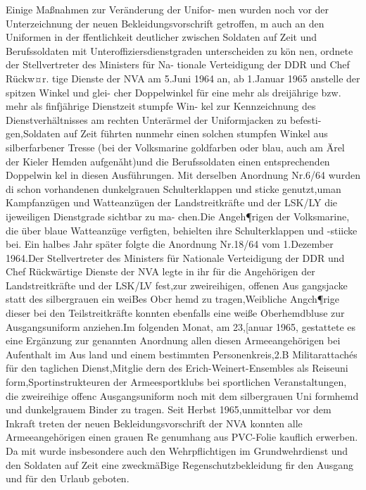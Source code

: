 

Einige Maßnahmen zur Veränderung der Unifor-
men wurden noch vor der Unterzeichnung der
neuen Bekleidungsvorschrift getroffen, m auch an
den Uniformen in der ffentlichkeit deutlicher
zwischen Soldaten auf Zeit und Berufssoldaten mit
Unteroffiziersdienstgraden unterscheiden zu kön
nen, ordnete der Stellvertreter des Ministers für Na-
tionale Verteidigung der DDR und Chef Rückw¤r.
tige Dienste der NVA am 5.Juni 1964 an, ab
1.Januar 1965 anstelle der spitzen Winkel und glei-
cher Doppelwinkel für eine mehr als dreijährige
bzw. mehr als finfjährige Dienstzeit stumpfe Win-
kel zur Kennzeichnung des Dienstverhältnisses am
rechten Unterärmel der Uniformjacken zu befesti-
gen,Soldaten auf Zeit führten nunmehr einen solchen stumpfen Winkel aus silberfarbener Tresse
(bei der Volksmarine goldfarben oder blau, auch
am Ärel der Kieler Hemden aufgenǎht)und die
Berufssoldaten einen entsprechenden Doppelwin
kel in diesen Ausführungen.
Mit derselben Anordnung Nr.6/64 wurden di
schon vorhandenen dunkelgrauen Schulterklappen
und sticke genutzt,uman Kampfanzügen und
Watteanzügen der Landstreitkräfte und der
LSK/LY die ijeweiligen Dienstgrade sichtbar zu ma-
chen.Die Angeh¶rigen der Volksmarine, die über
blaue
Watteanzüge verfigten,
behielten ihre
Schulterklappen und -stiicke bei.
Ein halbes Jahr später folgte die Anordnung
Nr.18/64 vom 1.Dezember 1964.Der Stellvertreter
des Ministers für Nationale Verteidigung der DDR
und Chef Rückwärtige Dienste der NVA legte in
ihr für die Angehörigen der Landstreitkräfte und
der LSK/LV fest,zur zweireihigen, offenen Aus
gangsjacke statt des silbergrauen ein weiBes Obcr
hemd zu tragen,Weibliche Angch¶rige dieser bei
den Teilstreitkräfte konnten ebenfalls eine weiße
Oberhemdbluse zur Ausgangsuniform anziehen.Im
folgenden Monat, am 23,[anuar 1965, gestattete es
eine Ergänzung zur genannten Anordnung allen
diesen Armeeangehörigen bei Aufenthalt im Aus
land und einem bestimmten Personenkreis,2.B
Militarattachés für den taglichen Dienst,Mitglie
dern des Erich-Weinert-Ensembles als Reiseuni
form,Sportinstrukteuren der Armeesportklubs bei
sportlichen Veranstaltungen, die zweireihige offenc
Ausgangsuniform noch mit dem silbergrauen Uni
formhemd und dunkelgrauem Binder zu tragen.
Seit Herbst 1965,unmittelbar vor dem Inkraft
treten der neuen Bekleidungsvorschrift der NVA
konnten alle Armeeangehörigen einen grauen Re
genumhang aus PVC-Folie kauflich erwerben. Da
mit wurde insbesondere auch den Wehrpflichtigen
im Grundwehrdienst und den Soldaten auf Zeit eine zweckmäBige Regenschutzbekleidung fir den
Ausgang und für den Urlaub geboten.
